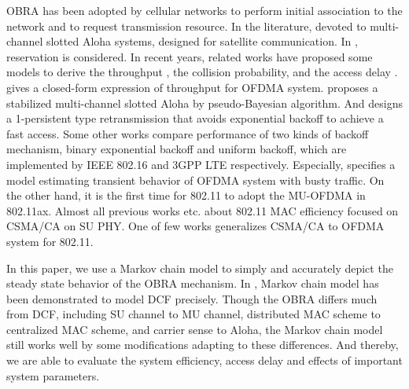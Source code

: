 \documentclass[journal]{IEEEtran}
\begin{document}
OBRA has been adopted by cellular networks to perform initial association to the network and to request transmission resource.
In the literature, \cite{tan1987performance}\cite{zhang1992multichannel} devoted to multi-channel slotted Aloha systems, \cite{tan1987performance} designed for satellite communication. In \cite{zhang1992multichannel}, reservation is considered. 
In recent years, related works have proposed some models to derive the throughput \cite{zhou2008efficient}\cite{shen2003performance}\cite{choi2006multichannel}, the collision probability\cite{kim2012performance}\cite{seo2011design}, and the access delay \cite{zhou2008efficient}\cite{kim2012performance}\cite{seo2011design}\cite{behroozi1992delay}. 
\cite{zhou2008efficient} gives a closed-form expression of throughput for OFDMA system. 
\cite{shen2003performance} proposes a stabilized multi-channel slotted Aloha by pseudo-Bayesian algorithm.
And \cite{choi2006multichannel} designs a 1-persistent type retransmission that avoids exponential backoff to achieve a fast access.
Some other works \cite{zhou2008efficient}\cite{seo2011design}\cite{kim2012performance} compare performance of two kinds of backoff mechanism, binary exponential backoff and uniform backoff, which are implemented by IEEE 802.16 and 3GPP LTE respectively.  
Especially, \cite{wei2015modeling} specifies a model estimating transient behavior of OFDMA system with busty traffic.
On the other hand, it is the first time for 802.11 to adopt the MU-OFDMA in 802.11ax. 
Almost all previous works \cite{cali2000dynamic}\cite{bianchi2000performance} etc. about 802.11 MAC efficiency focused on CSMA/CA on SU PHY. 
One of few works \cite{GeneralizedOFDMACSMACA} generalizes CSMA/CA to OFDMA system for 802.11.


In this paper, we use a Markov chain model to simply and accurately depict the steady state behavior of the OBRA mechanism. 
In \cite{bianchi2000performance}, Markov chain model has been demonstrated to model DCF precisely.
Though the OBRA differs much from DCF, including SU channel to MU channel, distributed MAC scheme to centralized MAC scheme, and carrier sense to Aloha, the Markov chain model still works well by some modifications adapting to these differences.
And thereby, we are able to evaluate the system efficiency, access delay and effects of important system parameters. 
\end{document}

